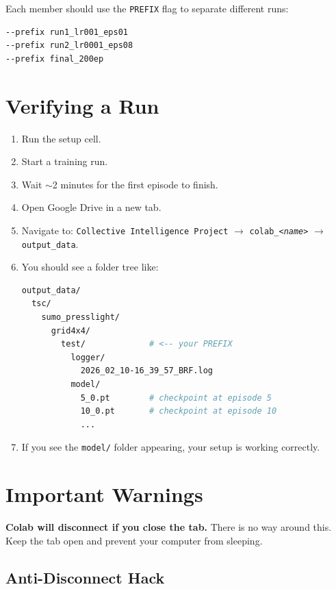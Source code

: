 \documentclass[11pt,a4paper]{article}
\begin{document}
Each member should use the \texttt{PREFIX} flag to separate different runs:
\begin{lstlisting}[language=bash]
--prefix run1_lr001_eps01
--prefix run2_lr0001_eps08
--prefix final_200ep
\end{lstlisting}

\section{Verifying a Run}

\begin{enumerate}
    \item Run the setup cell.
    \item Start a training run.
    \item Wait $\sim$2 minutes for the first episode to finish.
    \item Open Google Drive in a new tab.
    \item Navigate to: \texttt{Collective Intelligence Project} $\to$ \texttt{colab\_\textit{<name>}} $\to$ \texttt{output\_data}.
    \item You should see a folder tree like:
\begin{lstlisting}[language=bash]
output_data/
  tsc/
    sumo_presslight/
      grid4x4/
        test/             # <-- your PREFIX
          logger/
            2026_02_10-16_39_57_BRF.log
          model/
            5_0.pt        # checkpoint at episode 5
            10_0.pt       # checkpoint at episode 10
            ...
\end{lstlisting}
    \item If you see the \texttt{model/} folder appearing, your setup is working correctly.
\end{enumerate}

\section{Important Warnings}

\begin{warningbox}
\textbf{Colab will disconnect if you close the tab.}
There is no way around this.  Keep the tab open and prevent your computer from sleeping.
\end{warningbox}

\subsection{Anti-Disconnect Hack}
\end{document}
